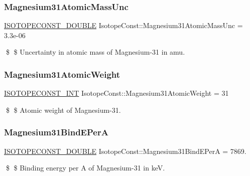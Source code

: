 \subsubsection{\texorpdfstring{Magnesium31\+Atomic\+Mass\+Unc}{Magnesium31AtomicMassUnc}}
{\footnotesize\ttfamily \mbox{\hyperlink{group___isotope_const-_macros_ga8f45a7272ce02c0b4c65c44636ed719a}{I\+S\+O\+T\+O\+P\+E\+C\+O\+N\+S\+T\+\_\+\+D\+O\+U\+B\+LE}} Isotope\+Const\+::\+Magnesium31\+Atomic\+Mass\+Unc = 3.\+3e-\/06}

\$ \$ Uncertainty in atomic mass of Magnesium-\/31 in amu. \mbox{\label{group___isotope_const-_magnesium-_mg31_gae02ea26168497d68bd6eba4021c95782}} 
\subsubsection{\texorpdfstring{Magnesium31\+Atomic\+Weight}{Magnesium31AtomicWeight}}
{\footnotesize\ttfamily \mbox{\hyperlink{group___isotope_const-_macros_ga5f18360b3e99483a35c32d789e62621c}{I\+S\+O\+T\+O\+P\+E\+C\+O\+N\+S\+T\+\_\+\+I\+NT}} Isotope\+Const\+::\+Magnesium31\+Atomic\+Weight = 31}

\$ \$ Atomic weight of Magnesium-\/31. \mbox{\label{group___isotope_const-_magnesium-_mg31_gaddc90bf00b17f12c79e4c9c1898b95fa}} 
\subsubsection{\texorpdfstring{Magnesium31\+Bind\+E\+PerA}{Magnesium31BindEPerA}}
{\footnotesize\ttfamily \mbox{\hyperlink{group___isotope_const-_macros_ga8f45a7272ce02c0b4c65c44636ed719a}{I\+S\+O\+T\+O\+P\+E\+C\+O\+N\+S\+T\+\_\+\+D\+O\+U\+B\+LE}} Isotope\+Const\+::\+Magnesium31\+Bind\+E\+PerA = 7869.}

\$ \$ Binding energy per A of Magnesium-\/31 in keV. \mbox{\label{group___isotope_const-_magnesium-_mg31_gab2dbe145fb67a4a8c97e870c14deaab0}} 
